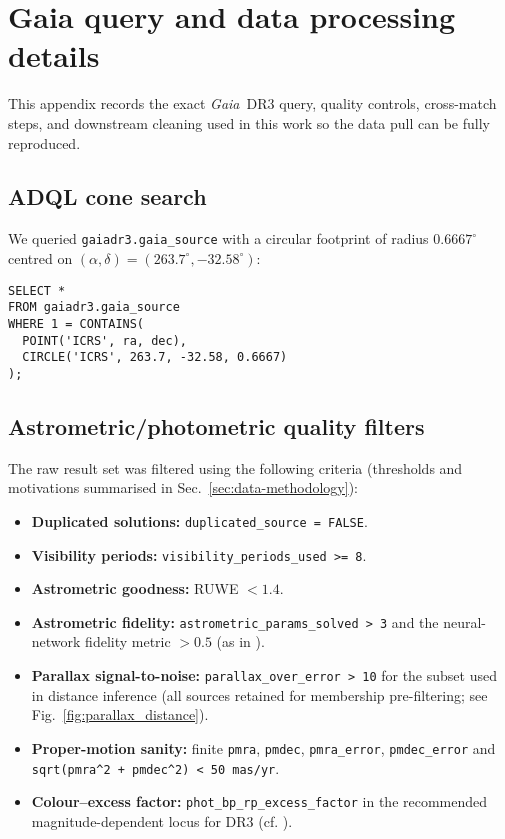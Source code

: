 \documentclass[../main.tex]{subfiles}
\begin{document}
\renewcommand{\thesection}{A\arabic{section}}
\renewcommand{\thetable}{A\arabic{section}.\arabic{table}}
\renewcommand{\thefigure}{A\arabic{section}.\arabic{figure}}

\section{Gaia query and data processing details}
\label{app:data}

This appendix records the exact \textit{Gaia}~DR3 query, quality controls, cross-match steps, and downstream cleaning used in this work so the data pull can be fully reproduced.

\subsection{ADQL cone search}
We queried \texttt{gaiadr3.gaia\_source} with a circular footprint of radius $0.6667^{\circ}$ centred on $(\alpha,\delta)=(263.7^{\circ},-32.58^{\circ})$:
\begin{verbatim}
SELECT *
FROM gaiadr3.gaia_source
WHERE 1 = CONTAINS(
  POINT('ICRS', ra, dec),
  CIRCLE('ICRS', 263.7, -32.58, 0.6667)
);
\end{verbatim}

\subsection{Astrometric/photometric quality filters}
\label{app:data:quality}
The raw result set was filtered using the following criteria (thresholds and motivations summarised in Sec.~\ref{sec:data-methodology}):
\begin{itemize}
  \item \textbf{Duplicated solutions:} \verb|duplicated_source = FALSE|.
  \item \textbf{Visibility periods:} \verb|visibility_periods_used >= 8|.
  \item \textbf{Astrometric goodness:} RUWE $< 1.4$.
  \item \textbf{Astrometric fidelity:} \verb|astrometric_params_solved > 3| and the neural-network fidelity metric $>0.5$ (as in \citealt{2022MNRAS.510.2597R}).
  \item \textbf{Parallax signal-to-noise:} \verb|parallax_over_error > 10| for the subset used in distance inference (all sources retained for membership pre-filtering; see Fig.~\ref{fig:parallax_distance}).
  \item \textbf{Proper-motion sanity:} finite \verb|pmra|, \verb|pmdec|, \verb|pmra_error|, \verb|pmdec_error| and \verb|sqrt(pmra^2 + pmdec^2) < 50 mas/yr|.
  \item \textbf{Colour–excess factor:} \verb|phot_bp_rp_excess_factor| in the recommended magnitude-dependent locus for DR3 (cf. \citealt{2021A&A...649A...3R}).
\end{itemize}
\end{document}
